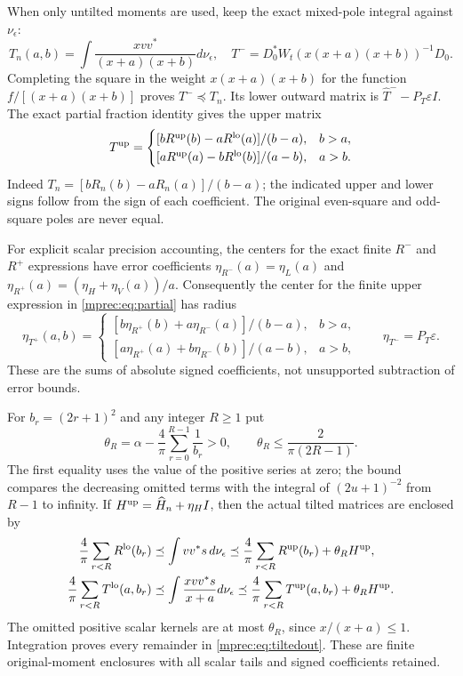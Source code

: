 When only untilted moments are used, keep the exact mixed-pole
integral against $\nu_\epsilon$:
\[
 T_n(a,b)=\int\frac{xvv^*}{(x+a)(x+b)}d\nu_\epsilon,
 \quad T^- =D_0^*W_t(x(x+a)(x+b))^{-1}D_0.
\]
Completing the square in the weight $x(x+a)(x+b)$ for the
function $f/[(x+a)(x+b)]$ proves $T^-\preceq T_n$.
Its lower outward matrix is $\widehat T^--P_T\varepsilon I$.
The exact partial fraction identity gives the upper matrix
\begin{equation}\label{mprec:eq:partial}
 T^{\rm up}=
 \begin{cases}
 [bR^{\rm up}(b)-aR^{\rm lo}(a)]/(b-a),&b>a,\\
 [aR^{\rm up}(a)-bR^{\rm lo}(b)]/(a-b),&a>b.
 \end{cases}
\end{equation}
Indeed $T_n=[bR_n(b)-aR_n(a)]/(b-a)$; the indicated upper
and lower signs follow from the sign of each coefficient. The
original even-square and odd-square poles are never equal.

For explicit scalar precision accounting, the centers for the
exact finite $R^-$ and $R^+$ expressions have error coefficients
$\eta_{R^-}(a)=\eta_L(a)$ and
$\eta_{R^+}(a)=(\eta_H+\eta_V(a))/a$. Consequently the
center for the finite upper expression in \eqref{mprec:eq:partial}
has radius
\[
 \eta_{T^+}(a,b)=
 \begin{cases}
 [b\eta_{R^+}(b)+a\eta_{R^-}(a)]/(b-a),&b>a,\\
 [a\eta_{R^+}(a)+b\eta_{R^-}(b)]/(a-b),&a>b,
 \end{cases}
 \qquad \eta_{T^-}=P_T\varepsilon.
\]
These are the sums of absolute signed coefficients, not
unsupported subtraction of error bounds.

For $b_r=(2r+1)^2$ and any integer $R\ge1$ put
\[
 \theta_R=\alpha-\frac4\pi\sum_{r=0}^{R-1}\frac1{b_r}>0,
 \qquad\theta_R\le\frac2{\pi(2R-1)}.
\]
The first equality uses the value of the positive series at zero;
the bound compares the decreasing omitted terms with the integral
of $(2u+1)^{-2}$ from $R-1$ to infinity. If
$H^{\rm up}=\widehat H_n+\eta_HI$, then the actual tilted
matrices are enclosed by
\begin{equation}\label{mprec:eq:tiltedout}
 \begin{aligned}
 \frac4\pi\sum_{r<R}R^{\rm lo}(b_r)
 &\preceq \int vv^*s\,d\nu_\epsilon
 \preceq\frac4\pi\sum_{r<R}R^{\rm up}(b_r)+\theta_RH^{\rm up},\\
 \frac4\pi\sum_{r<R}T^{\rm lo}(a,b_r)
 &\preceq \int\frac{xvv^*s}{x+a}d\nu_\epsilon
 \preceq\frac4\pi\sum_{r<R}T^{\rm up}(a,b_r)+\theta_RH^{\rm up}.
 \end{aligned}
\end{equation}
The omitted positive scalar kernels are at most $\theta_R$,
since $x/(x+a)\le1$. Integration proves every remainder in
\eqref{mprec:eq:tiltedout}. These are finite original-moment enclosures
with all scalar tails and signed coefficients retained.


